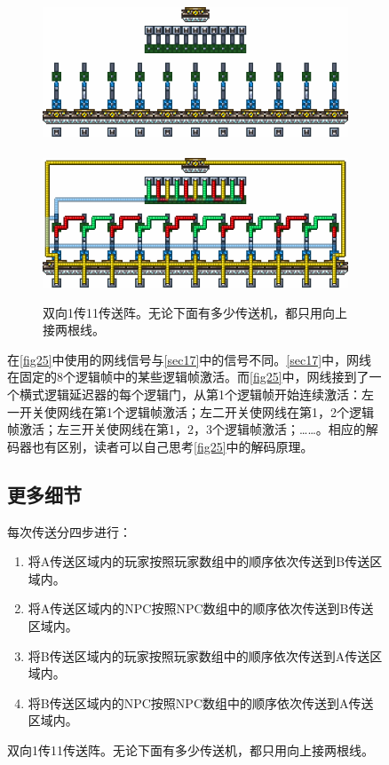 \begin{figure}[!ht]
\begin{figure}[!ht]
\centering
\includegraphics{images/389.png}\\
\mbox{}\\
\includegraphics{images/390.png}
\caption{双向1传11传送阵。无论下面有多少传送机，都只用向上接两根线。}\label{fig25}
\end{figure}

在\autoref{fig25}中使用的网线信号与\autoref{sec17}中的信号不同。\autoref{sec17}中，网线在固定的8个逻辑帧中的某些逻辑帧激活。而\autoref{fig25}中，网线接到了一个横式逻辑延迟器的每个逻辑门，从第1个逻辑帧开始连续激活：左一开关使网线在第1个逻辑帧激活；左二开关使网线在第1，2个逻辑帧激活；左三开关使网线在第1，2，3个逻辑帧激活；……。相应的解码器也有区别，读者可以自己思考\autoref{fig25}中的解码原理。

\subsection{更多细节}\label{sec9}
每次传送分四步进行：
\begin{enumerate}
\item 将A传送区域内的玩家按照玩家数组中的顺序依次传送到B传送区域内。
\item 将A传送区域内的NPC按照NPC数组中的顺序依次传送到B传送区域内。
\item 将B传送区域内的玩家按照玩家数组中的顺序依次传送到A传送区域内。
\item 将B传送区域内的NPC按照NPC数组中的顺序依次传送到A传送区域内。
\end{enumerate}


\end{figure}
